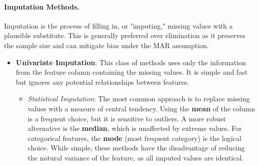 \paragraph{Imputation Methods.} Imputation is the process of filling in, or "imputing," missing values with a plausible substitute. This is generally preferred over elimination as it preserves the sample size and can mitigate bias under the MAR assumption.

\begin{itemize}
    \item \textbf{Univariate Imputation}: This class of methods uses only the information from the feature column containing the missing values. It is simple and fast but ignores any potential relationships between features.
    \begin{itemize}
        \item \textit{Statistical Imputation}: The most common approach is to replace missing values with a measure of central tendency. Using the \textbf{mean} of the column is a frequent choice, but it is sensitive to outliers. A more robust alternative is the \textbf{median}, which is unaffected by extreme values. For categorical features, the \textbf{mode} (most frequent category) is the logical choice. While simple, these methods have the disadvantage of reducing the natural variance of the feature, as all imputed values are identical.
    \end{itemize}
    

\end{itemize}
